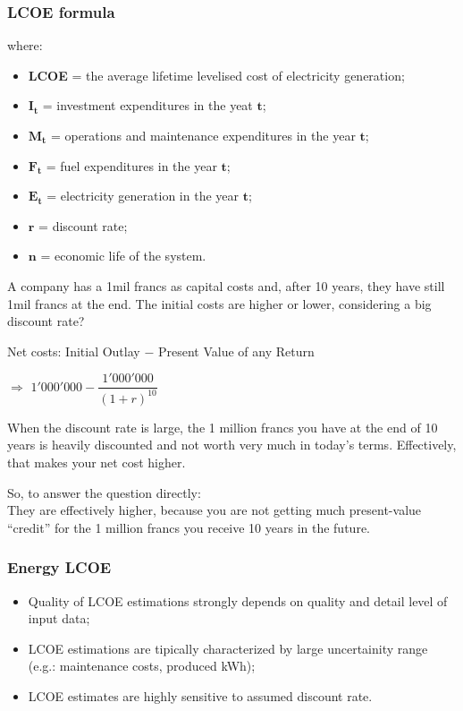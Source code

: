 \documentclass{article}
\begin{document}
\subsubsection{LCOE formula}
where:
\begin{itemize}
    \item \textbf{LCOE} = the average lifetime levelised cost of electricity generation;
    \item $\mathbf{I_t}$ = investment expenditures in the yeat $\mathbf{t}$;
    \item $\mathbf{M_t}$ = operations and maintenance expenditures in the year $\mathbf{t}$;
    \item $\mathbf{F_t}$ = fuel expenditures in the year $\mathbf{t}$;
    \item $\mathbf{E_t}$ = electricity generation in the year $\mathbf{t}$;
    \item $\mathbf{r}$ = discount rate;
    \item $\mathbf{n}$ = economic life of the system.
\end{itemize}

A company has a 1mil francs as capital costs and, after 10 years, they have still 1mil francs at the end. The initial costs are higher or lower, considering a big discount rate?

Net costs: Initial Outlay $-$ Present Value of any Return

$\Rightarrow$ $1'000'000 - \dfrac{1'000'000}{(1+r)^{10}}$

When the discount rate is large, the 1 million francs you have at the end of 10 years is heavily discounted and not worth very much in today’s terms. Effectively, that makes your net cost higher.

So, to answer the question directly:\\
They are effectively higher, because you are not getting much present-value ``credit'' for the 1 million francs you receive 10 years in the future.

\subsubsection{Energy LCOE}
\begin{itemize}
    \item Quality of LCOE estimations strongly depends on quality and detail level of input data;
    \item LCOE estimations are tipically characterized by large uncertainity range (e.g.: maintenance costs, produced kWh);
    \item LCOE estimates are highly sensitive to assumed discount rate.
\end{itemize}
\end{document}
